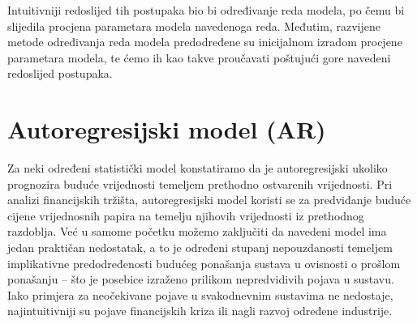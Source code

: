 \documentclass[a4paper,12pt,oneside]{memoir}
\begin{document}
        Intuitivniji redoslijed tih postupaka bio bi određivanje reda modela, po čemu bi slijedila procjena parametara modela navedenoga reda. Međutim, razvijene metode određivanja reda modela predodređene su inicijalnom izradom procjene parametara modela, te ćemo ih kao takve proučavati poštujući gore navedeni redoslijed postupaka. \cite{Priestley}

        \section{Autoregresijski model (AR)}

            Za neki određeni statistički model konstatiramo da je autoregresijski ukoliko prognozira buduće vrijednosti temeljem prethodno ostvarenih vrijednosti. Pri analizi financijskih tržišta, autoregresijski model koristi se za predviđanje buduće cijene vrijednosnih papira na temelju njihovih vrijednosti iz prethodnog razdoblja. Već u samome početku možemo zaključiti da navedeni model ima jedan praktičan nedostatak, a to je određeni stupanj nepouzdanosti temeljem implikativne predodređenosti budućeg ponašanja sustava u ovisnosti o prošlom ponašanju -- što je posebice izraženo prilikom nepredvidivih pojava u sustavu. Iako primjera za neočekivane pojave u svakodnevnim sustavima ne nedostaje, najintuitivniji su pojave financijskih kriza ili nagli razvoj određene industrije.
\end{document}
